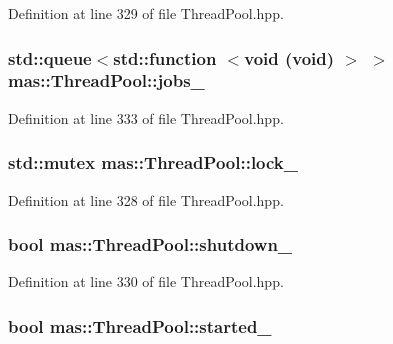 Definition at line 329 of file Thread\-Pool.\-hpp.

\hypertarget{classmas_1_1_thread_pool_a650277a4bb117f7edc7230709d3af937}{
\subsubsection[{jobs\-\_\-}]{\setlength{\rightskip}{0pt plus 5cm}std\-::queue$<$std\-::function $<$void (void) $>$ $>$ mas\-::\-Thread\-Pool\-::jobs\-\_\-\hspace{0.3cm}{\ttfamily [protected]}}}\label{classmas_1_1_thread_pool_a650277a4bb117f7edc7230709d3af937}


Definition at line 333 of file Thread\-Pool.\-hpp.

\hypertarget{classmas_1_1_thread_pool_aa5731410511500215316dfcb867da937}{
\subsubsection[{lock\-\_\-}]{\setlength{\rightskip}{0pt plus 5cm}std\-::mutex mas\-::\-Thread\-Pool\-::lock\-\_\-\hspace{0.3cm}{\ttfamily [protected]}}}\label{classmas_1_1_thread_pool_aa5731410511500215316dfcb867da937}


Definition at line 328 of file Thread\-Pool.\-hpp.

\hypertarget{classmas_1_1_thread_pool_acfad0274ea87fdb8a308f1797375401b}{
\subsubsection[{shutdown\-\_\-}]{\setlength{\rightskip}{0pt plus 5cm}bool mas\-::\-Thread\-Pool\-::shutdown\-\_\-\hspace{0.3cm}{\ttfamily [protected]}}}\label{classmas_1_1_thread_pool_acfad0274ea87fdb8a308f1797375401b}


Definition at line 330 of file Thread\-Pool.\-hpp.

\hypertarget{classmas_1_1_thread_pool_ade7e910b5ff594a59eac9e351dda8ccb}{
\subsubsection[{started\-\_\-}]{\setlength{\rightskip}{0pt plus 5cm}bool mas\-::\-Thread\-Pool\-::started\-\_\-\hspace{0.3cm}{\ttfamily [protected]}}}\label{classmas_1_1_thread_pool_ade7e910b5ff594a59eac9e351dda8ccb}



